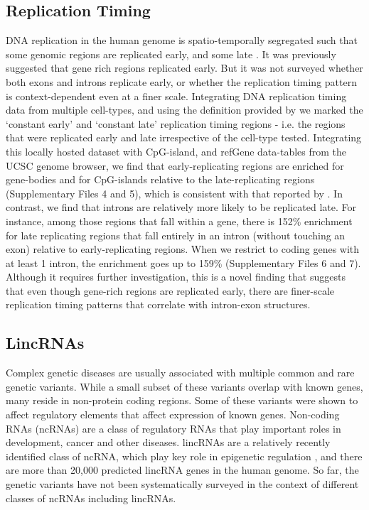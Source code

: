\documentclass{bioinfo}
\begin{document}
\subsection{Replication Timing}
DNA replication in the human genome is spatio-temporally segregated such that some genomic regions are replicated early, and some late \citep{Hansen}. It was previously suggested that gene rich regions replicated early. But it was not surveyed whether both exons and introns replicate early, or whether the replication timing pattern is context-dependent even at a finer scale. 
Integrating DNA replication timing data from multiple cell-types, and using the definition provided by \citep{Hansen} we marked the ‘constant early’ and ‘constant late’ replication timing regions - i.e. the regions that were replicated early and late irrespective of the cell-type tested. Integrating this locally hosted dataset with CpG-island, and refGene data-tables from the UCSC genome browser, we find  that early-replicating regions are enriched for gene-bodies and for CpG-islands relative to the late-replicating regions (Supplementary Files 4 and 5), which is consistent with that reported by \citep{Hansen}. In contrast, we find that introns are relatively more likely to be replicated late. For instance, among those regions that fall within a gene, there is 152\% enrichment for late replicating regions that fall entirely in an intron (without touching an exon) relative to early-replicating regions. When we restrict to coding genes with at least 1 intron, the enrichment goes up to 159\% (Supplementary Files 6 and 7). Although it requires further investigation, this is a novel finding that suggests that even though gene-rich regions are replicated early, there are finer-scale replication timing patterns that correlate with intron-exon structures.

\subsection{LincRNAs}
Complex genetic diseases are usually associated with multiple common and rare genetic variants. While a small subset of these variants overlap with known genes, many reside in non-protein coding regions. Some of these variants were shown to affect regulatory elements that affect expression of known genes. Non-coding RNAs (ncRNAs) are a class of regulatory RNAs that play important roles in development, cancer and other diseases. lincRNAs are a relatively recently identified class of ncRNA, which play key role in epigenetic regulation \citep{Lee}, and there are more than 20,000 predicted lincRNA genes in the human genome. So far, the genetic variants have not been systematically surveyed in the context of different classes of ncRNAs including lincRNAs. 
\end{document}
